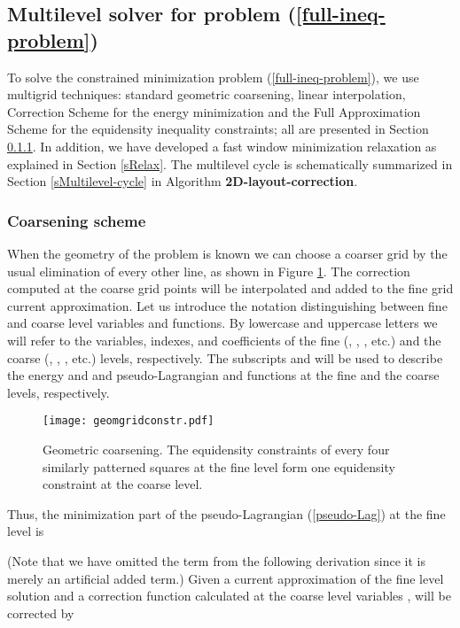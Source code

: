 \documentclass[final]{siamltex}
\begin{document}
\subsection{Multilevel solver for problem (\ref{full-ineq-problem})}\label{sMultSolver2}
\par To solve the constrained minimization problem (\ref{full-ineq-problem}), we use
multigrid techniques: standard geometric coarsening, linear
interpolation, Correction Scheme for the energy minimization and
the Full Approximation Scheme for the equidensity inequality
constraints; all are presented in Section
\ref{sCoarsening-scheme}. In addition, we have developed a fast
window minimization relaxation as explained in Section
\ref{sRelax}. The multilevel cycle is schematically summarized in
Section \ref{sMultilevel-cycle} in Algorithm {\bf
2D-layout-correction}.

\subsubsection{Coarsening scheme}\label{sCoarsening-scheme}
When the geometry of the problem is known we can choose a coarser
grid by the usual elimination of every other line, as shown in
Figure \ref{geomgridcors}. The correction computed at the coarse
grid points will be interpolated and added to the fine grid
current approximation. Let us introduce the notation
distinguishing between fine and coarse level variables and
functions. By lowercase and uppercase letters we will refer to the
variables, indexes, and coefficients of the fine (, ,
, etc.) and the coarse (, , , etc.) levels,
respectively. The subscripts  and  will be used to describe
the energy  and  and
pseudo-Lagrangian  and  functions at the fine
and the coarse levels, respectively.
\begin{figure}
\vbox{\center\texttt{[image: geomgridconstr.pdf]}}
\caption{Geometric coarsening. The equidensity constraints of
every four similarly patterned squares at the fine level form one
equidensity constraint at the coarse level.}\label{geomgridcors}
\end{figure}
\par Thus, the minimization part of the pseudo-Lagrangian (\ref{pseudo-Lag})
at the fine level is

(Note that we have omitted the  term from the following
derivation since it is merely an artificial added term.) Given a
current approximation  of the fine level solution
 and a correction function  calculated at the coarse
level variables ,  will be corrected by
\end{document}
